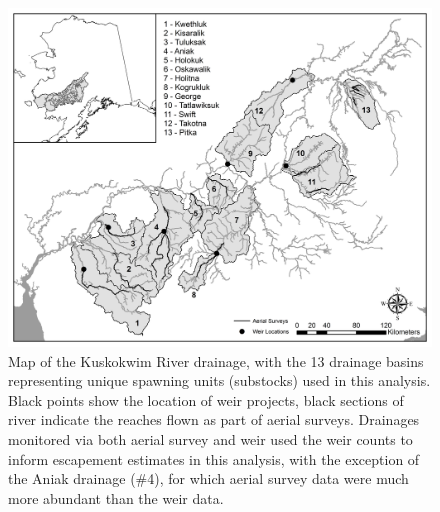 \documentclass[12pt,]{book}
\theoremstyle{definition}
\theoremstyle{definition}
\theoremstyle{definition}
\theoremstyle{remark}
\begin{document}
\clearpage

\begin{figure}
  \centering
  \includegraphics{img/Ch4/ch4-map.jpg}
  \caption{Map of the Kuskokwim River drainage, with the 13 drainage basins representing unique spawning units (substocks) used in this analysis. Black points show the location of weir projects, black sections of river indicate the reaches flown as part of aerial surveys. Drainages monitored via both aerial survey and weir used the weir counts to inform escapement estimates in this analysis, with the exception of the Aniak drainage (\#4), for which aerial survey data were much more abundant than the weir data.}
  \label{fig:ch4-map}
\end{figure}

\clearpage
\end{document}
